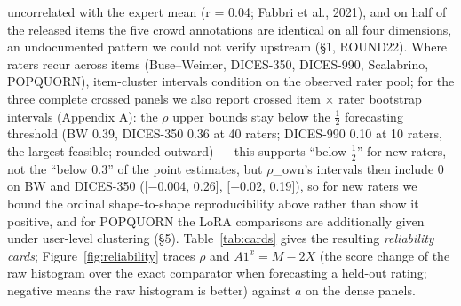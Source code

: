 \documentclass[10pt]{article}
\begin{document}
uncorrelated with the expert mean (r = 0.04; Fabbri et al., 2021), and on half of the released items the five crowd annotations are identical on all four dimensions, an undocumented pattern we could not verify upstream (\S{}1, ROUND22). Where raters recur across items (Buse--Weimer, DICES-350, DICES-990, Scalabrino, POPQUORN), item-cluster intervals condition on the observed rater pool; for the three complete crossed panels we also report crossed item $\times$ rater bootstrap intervals (Appendix A): the $\rho$ upper bounds stay below the $\tfrac12$ forecasting threshold (BW 0.39, DICES-350 0.36 at 40 raters; DICES-990 0.10 at 10 raters, the largest feasible; rounded outward) --- this supports ``below $\tfrac12$'' for new raters, not the ``below 0.3'' of the point estimates, but $\rho$\_own's intervals then include 0 on BW and DICES-350 ({[}$-$0.004, 0.26{]}, {[}$-$0.02, 0.19{]}), so for new raters we bound the ordinal shape-to-shape reproducibility above rather than show it positive, and for POPQUORN the LoRA comparisons are additionally given under user-level clustering (\S{}5). Table~\ref{tab:cards} gives the resulting \emph{reliability cards}; Figure~\ref{fig:reliability} traces \(\rho\) and \(A1^x = M-2X\) (the score change of the raw histogram over the exact comparator when forecasting a held-out rating; negative means the raw histogram is better) against \(a\) on the dense panels.
\end{document}
